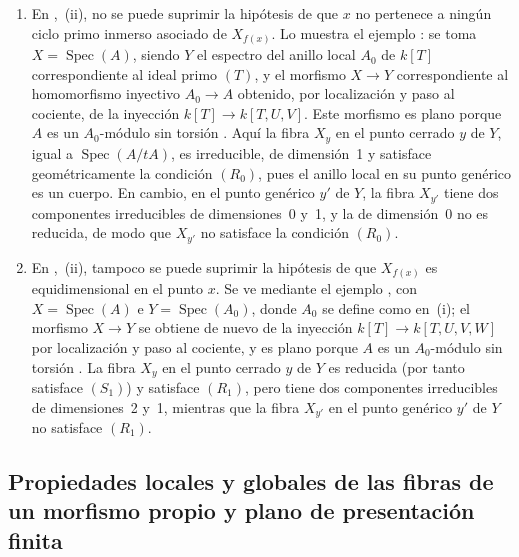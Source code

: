 \begin{remarks}[12.1.8]
\label{IV.12.1.8}
\begin{enumerate}[label=(\roman*)]
  \item En ,~(ii), no se puede suprimir la hipótesis de que $x$ no pertenece a ningún ciclo primo inmerso asociado de $X_{f(x)}$.
Lo muestra el ejemplo : se toma $X=\operatorname{Spec}(A)$, siendo $Y$ el espectro del anillo local $A_0$ de $k[T]$ correspondiente al ideal primo $(T)$, y el morfismo $X\to Y$ correspondiente al homomorfismo inyectivo $A_0\to A$ obtenido, por localización y paso al cociente, de la inyección $k[T]\to k[T,U,V]$.
Este morfismo es plano porque $A$ es un $A_0$-módulo sin torsión .
Aquí la fibra $X_y$ en el punto cerrado $y$ de $Y$, igual a $\operatorname{Spec}(A/tA)$, es irreducible, de dimensión~1 y satisface geométricamente la condición $(R_0)$, pues el anillo local en su punto genérico es un cuerpo.
En cambio, en el punto genérico $y'$ de $Y$, la fibra $X_{y'}$ tiene dos componentes irreducibles de dimensiones~0 y~1, y la de dimensión~0 no es reducida, de modo que $X_{y'}$ no satisface la condición $(R_0)$.

  \item En ,~(ii), tampoco se puede suprimir la hipótesis de que $X_{f(x)}$ es equidimensional en el punto $x$.
Se ve mediante el ejemplo , con $X=\operatorname{Spec}(A)$ e $Y=\operatorname{Spec}(A_0)$, donde $A_0$ se define como en~(i); el morfismo $X\to Y$ se obtiene de nuevo de la inyección $k[T]\to k[T,U,V,W]$ por localización y paso al cociente, y es plano porque $A$ es un $A_0$-módulo sin torsión .
La fibra $X_y$ en el punto cerrado $y$ de $Y$ es reducida (por tanto satisface $(S_1)$) y satisface $(R_1)$, pero tiene dos componentes irreducibles de dimensiones~2 y~1, mientras que la fibra $X_{y'}$ en el punto genérico $y'$ de $Y$ no satisface $(R_1)$.
\end{enumerate}
\end{remarks}


\subsection{Propiedades locales y globales de las fibras de un morfismo propio y plano de presentación finita}
\label{subsection:IV.12.2}



